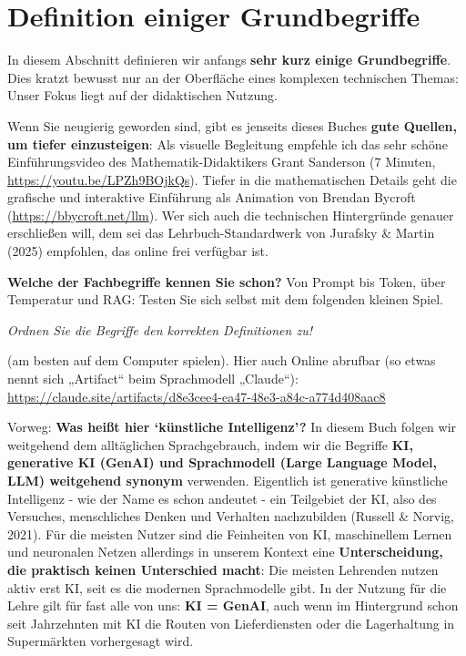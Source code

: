 \documentclass[
  ngerman,
  letterpaper,
  DIV=11]{scrreprt}
\begin{document}
\section{Definition einiger Grundbegriffe}\label{sec-definitionen}

In diesem Abschnitt definieren wir anfangs \textbf{sehr kurz einige
Grundbegriffe}. Dies kratzt bewusst nur an der Oberfläche eines
komplexen technischen Themas: Unser Fokus liegt auf der didaktischen
Nutzung.

Wenn Sie neugierig geworden sind, gibt es jenseits dieses Buches
\textbf{gute Quellen, um tiefer einzusteigen}: Als visuelle Begleitung
empfehle ich das sehr schöne Einführungsvideo des Mathematik-Didaktikers
Grant Sanderson (7 Minuten, \url{https://youtu.be/LPZh9BOjkQs}). Tiefer
in die mathematischen Details geht die grafische und interaktive
Einführung als Animation von Brendan Bycroft
(\url{https://bbycroft.net/llm}). Wer sich auch die technischen
Hintergründe genauer erschließen will, dem sei das Lehrbuch-Standardwerk
von Jurafsky \& Martin (2025) empfohlen, das online frei verfügbar ist.

\textbf{Welche der Fachbegriffe kennen Sie schon?} Von Prompt bis Token,
über Temperatur und RAG: Testen Sie sich selbst mit dem folgenden
kleinen Spiel.

\begin{tcolorbox}[enhanced jigsaw, left=2mm, bottomrule=.15mm, arc=.35mm, rightrule=.15mm, colframe=quarto-callout-tip-color-frame, coltitle=black, colback=white, toprule=.15mm, toptitle=1mm, colbacktitle=quarto-callout-tip-color!10!white, title=\textcolor{quarto-callout-tip-color}{\faLightbulb}\hspace{0.5em}{Lernspiel: Welche Grundbegriffe kennen Sie schon?}, opacitybacktitle=0.6, leftrule=.75mm, bottomtitle=1mm, titlerule=0mm, opacityback=0, breakable]

\emph{Ordnen Sie die Begriffe den korrekten Definitionen zu!}

(am besten auf dem Computer spielen). Hier auch Online abrufbar (so
etwas nennt sich „Artifact`` beim Sprachmodell „Claude``):
\url{https://claude.site/artifacts/d8e3cee4-ea47-48e3-a84c-a774d408aac8}

\end{tcolorbox}

Vorweg: \textbf{Was heißt hier `künstliche Intelligenz'?} In diesem Buch
folgen wir weitgehend dem alltäglichen Sprachgebrauch, indem wir die
Begriffe \textbf{KI, generative KI (GenAI) und Sprachmodell (Large
Language Model, LLM) weitgehend synonym} verwenden. Eigentlich ist
generative künstliche Intelligenz - wie der Name es schon andeutet - ein
Teilgebiet der KI, also des Versuches, menschliches Denken und Verhalten
nachzubilden (Russell \& Norvig, 2021). Für die meisten Nutzer sind die
Feinheiten von KI, maschinellem Lernen und neuronalen Netzen allerdings
in unserem Kontext eine \textbf{Unterscheidung, die praktisch keinen
Unterschied macht}: Die meisten Lehrenden nutzen aktiv erst KI, seit es
die modernen Sprachmodelle gibt. In der Nutzung für die Lehre gilt für
fast alle von uns: \textbf{KI = GenAI}, auch wenn im Hintergrund schon
seit Jahrzehnten mit KI die Routen von Lieferdiensten oder die
Lagerhaltung in Supermärkten vorhergesagt wird.
\end{document}
